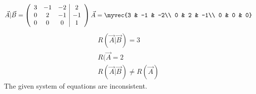 \begin{align}
\vec{A}|\vec{B}=\left(\begin{array}{ccc|c}  
 3 & -1 & -2 & 2\\  
 0 & 2 & -1 & -1\\
 0 & 0 & 0 & 1
\end{array}\right) 
\vec{A}=\myvec
 {3 & -1 & -2\\  
 0 & 2 & -1\\
 0 & 0 & 0}
\end{align}
\begin{align}
R(\vec{A}|\vec{B}) = 3\\
R(\vec{A} = 2\\
R(\vec{A}|\vec{B}) \neq  R(\vec{A})
\end{align}
The given system of equations are inconsistent.
